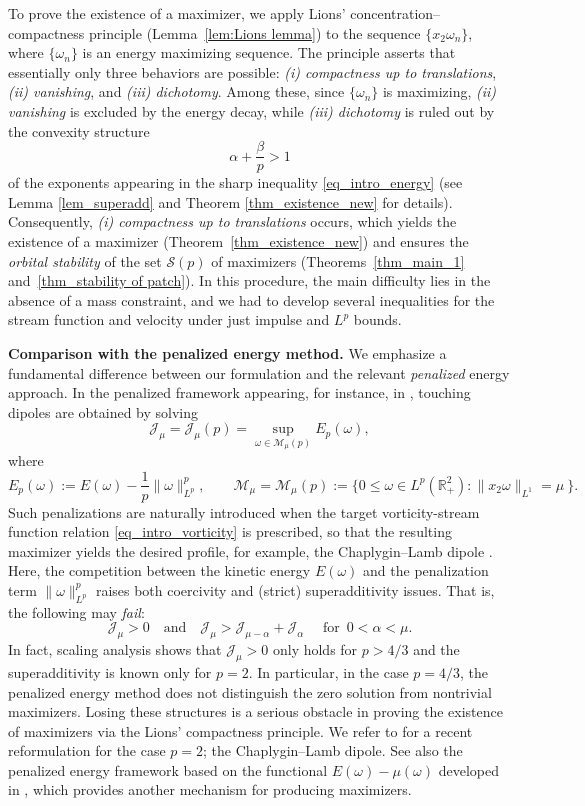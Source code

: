 \documentclass[11pt]{amsart}
\theoremstyle{definition}
\theoremstyle{definition}
\numberwithin{equation}{section}
\newcommand{\0}{\emptyset}
\newcommand{\bbR}{\mathbb R}
\newcommand{\calJ}{\mathcal J}
\newcommand{\calM}{\mathcal M}
\newcommand{\calS}{\mathcal S}
\begin{document}
	\noindent 
	To prove the existence of a maximizer, we apply Lions' concentration--compactness principle \cite{Lions1984} (Lemma~\ref{lem:Lions lemma}) to the sequence $\{x_2\omega_n \}$, where $\{\omega_n\}$ is an energy maximizing sequence. 
	The principle asserts that essentially only three behaviors are possible: \textit{(i) compactness {up to translations}}, \textit{(ii) vanishing}, and \textit{(iii) dichotomy}.
	Among these, since $\{\omega_n\}$ is maximizing, \textit{(ii) vanishing} is excluded by the energy decay, while \textit{(iii) dichotomy} is ruled out by the convexity structure  $$ { \alpha + \frac{\beta}{p} > 1}$$ of the exponents appearing in the sharp inequality \eqref{eq_intro_energy} (see Lemma \ref{lem_superadd} and Theorem \ref{thm_existence_new} for details).
	Consequently, \textit{(i) compactness {up to translations}} occurs, which yields the existence of a maximizer (Theorem~\ref{thm_existence_new}) and ensures the \textit{{orbital} stability} of the set $\calS(p)$ of maximizers  (Theorems~\ref{thm_main_1} and~\ref{thm_stability of patch}).
	In this procedure, the main difficulty lies in the absence of a mass constraint,
    and we had to develop several 
    inequalities for the stream function and velocity under just impulse and $L^p$ bounds.
	
	\medskip
	
	\noindent \textbf{Comparison with the penalized energy method.}
	We emphasize a fundamental difference between our formulation and the relevant \textit{penalized} energy approach.
	In the penalized framework appearing, for instance, in \cite{AC2022}, touching dipoles are obtained by solving
	\[
	\calJ_{\mu} = \calJ_{\mu}(p) = \sup_{\omega \in \calM_{\mu}(p)}E_p(\omega),
	\]
	where
	\[
	E_p(\omega) := E(\omega) - \frac{1}{p}\|\omega\|_{L^p}^p, \qquad \calM_{\mu} = \mathcal{M}_{\mu}(p):= \{ 0 \le \omega \in L^p(\bbR^2_+): \|x_2\omega\|_{L^1} = \mu\ \}.
	\]
	Such penalizations are naturally introduced when the target vorticity-stream function relation \eqref{eq_intro_vorticity} is prescribed, so that the resulting maximizer yields the desired profile, for example, the Chaplygin--Lamb dipole \cite{AC2022}.
	Here, the competition between the kinetic energy $E(\omega)$ and the penalization term $\|\omega\|_{L^p}^p$ raises both coercivity and (strict) superadditivity issues.
	That is, the following may \emph{fail}:
	\[
	\calJ_{\mu} > 0 \quad \textrm{and} \quad \calJ_{\mu} > \calJ_{\mu - \alpha} + \calJ_{\alpha} \quad \textrm{ for }\, 0 < \alpha < \mu.
	\]
	In fact, scaling analysis shows that $\calJ_{\mu}>0$ only holds for $p>4/3$ and the superadditivity is known only for $p = 2$.
	In particular, in the case $p = 4/3$, the penalized energy method does not distinguish the zero solution from nontrivial maximizers.
	Losing these structures is a serious obstacle in proving the existence of maximizers via the Lions' compactness principle.
	We refer to \cite{ACJ2025}   for a recent reformulation for the case $p=2$; the Chaplygin--Lamb dipole. See also the penalized energy framework based on the functional $E(\omega)-\mu(\omega)$ developed in \cite{Bur2005, BNL2013}, which provides another mechanism for producing maximizers.
\end{document}
